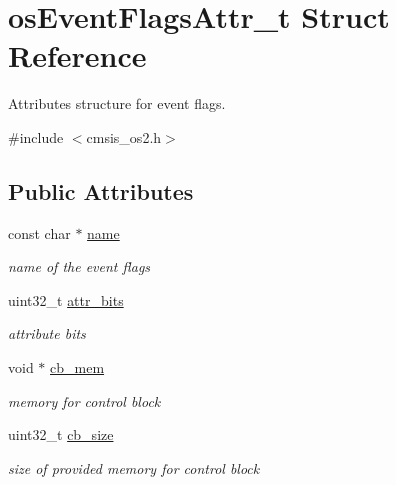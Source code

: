 \hypertarget{structos_event_flags_attr__t}{}\section{os\+Event\+Flags\+Attr\+\_\+t Struct Reference}
\label{structos_event_flags_attr__t}


Attributes structure for event flags.  




{\ttfamily \#include $<$cmsis\+\_\+os2.\+h$>$}

\subsection*{Public Attributes}
\begin{DoxyCompactItemize}
\item 
\mbox{\label{structos_event_flags_attr__t_ac3d95d16f3eed79d9e068567acb2b0d4}} 
const char $\ast$ \mbox{\hyperlink{structos_event_flags_attr__t_ac3d95d16f3eed79d9e068567acb2b0d4}{name}}
\begin{DoxyCompactList}\small\item\em name of the event flags \end{DoxyCompactList}\item 
\mbox{\label{structos_event_flags_attr__t_a7aabb3ae376079d34ddd78787733ca5c}} 
uint32\+\_\+t \mbox{\hyperlink{structos_event_flags_attr__t_a7aabb3ae376079d34ddd78787733ca5c}{attr\+\_\+bits}}
\begin{DoxyCompactList}\small\item\em attribute bits \end{DoxyCompactList}\item 
\mbox{\label{structos_event_flags_attr__t_adbcc8550d7f5129aacb083ac773874e4}} 
void $\ast$ \mbox{\hyperlink{structos_event_flags_attr__t_adbcc8550d7f5129aacb083ac773874e4}{cb\+\_\+mem}}
\begin{DoxyCompactList}\small\item\em memory for control block \end{DoxyCompactList}\item 
\mbox{\label{structos_event_flags_attr__t_a93ff7c1bc7cb7508e817b83169dc5840}} 
uint32\+\_\+t \mbox{\hyperlink{structos_event_flags_attr__t_a93ff7c1bc7cb7508e817b83169dc5840}{cb\+\_\+size}}
\begin{DoxyCompactList}\small\item\em size of provided memory for control block \end{DoxyCompactList}\end{DoxyCompactItemize}



